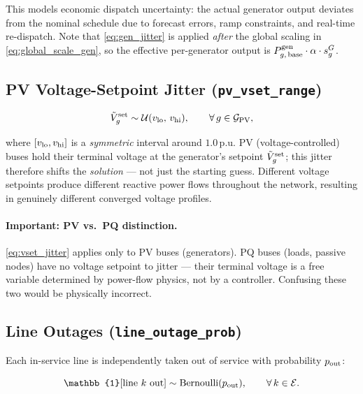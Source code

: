 \documentclass{article}
\begin{document}
This models economic dispatch uncertainty: the actual generator output
deviates from the nominal schedule due to forecast errors, ramp constraints,
and real-time re-dispatch.  Note that \eqref{eq:gen_jitter} is applied
\emph{after} the global scaling in \eqref{eq:global_scale_gen}, so the
effective per-generator output is
$P^{\rm gen}_{g,\,\rm base} \cdot \alpha \cdot s^G_g$.

\subsection{PV Voltage-Setpoint Jitter (\texttt{pv\_vset\_range})}

\begin{equation}
  \tilde{V}^{\rm set}_{g} \sim \mathcal{U}(v_{\rm lo},\, v_{\rm hi}),
  \qquad \forall\, g \in \mathcal{G}_{\rm PV},
  \label{eq:vset_jitter}
\end{equation}

where $[v_{\rm lo}, v_{\rm hi}]$ is a \emph{symmetric} interval around
$1.0\,\mathrm{p.u.}$  PV (voltage-controlled) buses hold their terminal
voltage at the generator's setpoint $\tilde{V}^{\rm set}_g$; this jitter
therefore shifts the \emph{solution} --- not just the starting guess.
Different voltage setpoints produce different reactive power flows throughout
the network, resulting in genuinely different converged voltage profiles.

\paragraph{Important: PV vs.\ PQ distinction.}
\eqref{eq:vset_jitter} applies only to PV buses (generators).  PQ buses
(loads, passive nodes) have no voltage setpoint to jitter --- their terminal
voltage is a free variable determined by power-flow physics, not by a
controller.  Confusing these two would be physically incorrect.

\subsection{Line Outages (\texttt{line\_outage\_prob})}

Each in-service line is independently taken out of service with probability
$p_{\rm out}$:

\begin{equation}
  \mathbb{1}[\text{line }k\text{ out}] \sim \mathrm{Bernoulli}(p_{\rm out}),
  \qquad \forall\, k \in \mathcal{E}.
  \label{eq:outage}
\end{equation}
\end{document}
